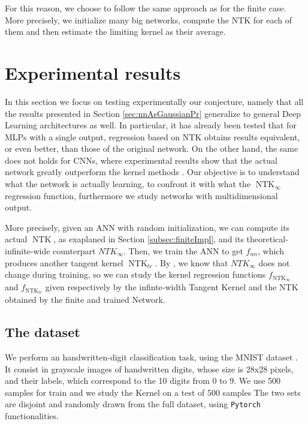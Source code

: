 \documentclass[11pt,notitlepage]{article}
\numberwithin{equation}{section}
\DeclareMathOperator{\NTK}{NTK}
\theoremstyle{remark}
\theoremstyle{definition}
\begin{document}
	For this reason, we choose to follow the same approach as for the finite case.
	More precisely, we initialize many big networks, compute the NTK for each of them and then estimate the limiting kernel as their average.
	
	\section{Experimental results}\label{sec:experiments}
	
	In this section we focus on testing experimentally our conjecture, namely that all the results presented in Section \ref{sec:nnAsGaussianPr} generalize to general Deep Learning architectures as well.
	In particular, it has already been tested that for MLPs with a single output, regression based on NTK obtains results equivalent, or even better, than those of the original network.
	On the other hand, the same does not holds for CNNs, where experimental results show that the actual network greatly outperform the kernel methods \cite{arora2019exact}.
	Our objective is to understand what the network is actually learning, to confront it with what the $\NTK_\infty$ regression function, furthermore we study networks with multidimensional output.
	
	More precisely, given an ANN with random initialization, we can compute its actual $\NTK$, as exaplaned in Section \ref{subsec:finiteImpl}, and its theoretical-infinite-wide counterpart $NTK_\infty$.
	Then, we train the ANN to get $f_{nn}$, which produces another tangent kernel $\NTK_{tr}$.
	By \cite{jacot2018neural}, we know that $NTK_\infty$ does not change during training, so we can study the kernel regression functions $f_{\NTK_\infty}$ and $f_{\NTK_{tr}}$ given respectively by the infinte-width Tangent Kernel and the NTK obtained by the finite and trained Network.
	
	\subsection{The dataset}\label{subsec:dataset}
	
	We perform an handwritten-digit classification task, using the MNIST dataset \cite{lecun2010mnist}.
	It consist in grayscale images of handwritten digits, whose size is 28x28 pixels, and their labels, which correspond to the 10 digits from 0 to 9.	
	We use 500 samples for train and we study the Kernel on a test of 500 samples
	The two sets are disjoint and randomly drawn from the full dataset, using \verb|Pytorch| functionalities.
	
\end{document}

